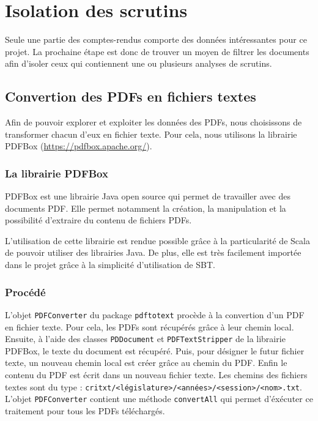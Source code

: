 \section{Isolation des scrutins}

Seule une partie des comptes-rendus comporte des données intéressantes pour ce projet. La prochaine étape est donc de trouver un moyen de filtrer les documents afin d'isoler ceux qui contiennent une ou plusieurs analyses de scrutins.

\subsection{Convertion des PDFs en fichiers textes}

Afin de pouvoir explorer et exploiter les données des PDFs, nous choisissons de transformer chacun d'eux en fichier texte. Pour cela, nous utilisons la librairie PDFBox (\url{https://pdfbox.apache.org/}).

\subsubsection{La librairie PDFBox}

PDFBox est une librairie Java open source qui permet de travailler avec des documents PDF. Elle permet notamment la création, la manipulation et la possibilité d'extraire du contenu de fichiers PDFs.

L'utilisation de cette librairie est rendue possible grâce à la particularité de Scala de pouvoir utiliser des librairies Java. De plus, elle est très facilement importée dans le projet grâce à la simplicité d'utilisation de SBT.

\subsubsection{Procédé}

L'objet \verb|PDFConverter| du package \verb|pdftotext| procède à la convertion d'un PDF en fichier texte.\newline
Pour cela, les PDFs sont récupérés grâce à leur chemin local. Ensuite, à l'aide des classes \verb|PDDocument| et \verb|PDFTextStripper| de la librairie PDFBox, le texte du document est récupéré. Puis, pour désigner le futur fichier texte, un nouveau chemin local est créer grâce au chemin du PDF. Enfin le contenu du PDF est écrit dans un nouveau fichier texte. Les chemins des fichiers textes sont du type : \verb|critxt/<législature>/<années>/<session>/<nom>.txt|. L'objet \verb|PDFConverter| contient une méthode \verb|convertAll| qui permet d'éxécuter ce traitement pour tous les PDFs téléchargés.

